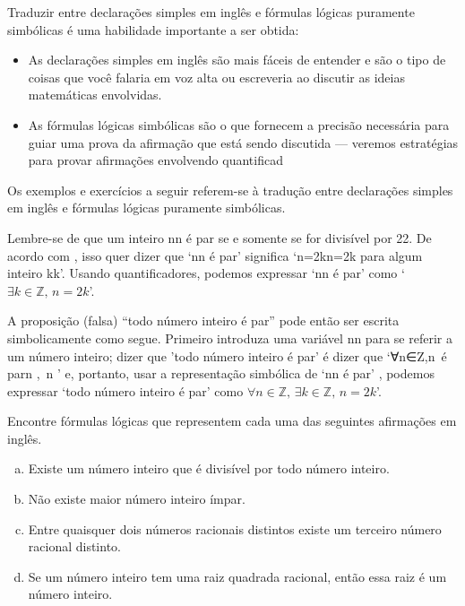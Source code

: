 Traduzir entre declarações simples em inglês e fórmulas lógicas puramente simbólicas é uma habilidade importante a ser obtida:
\begin{itemize}
\item As declarações simples em inglês são mais fáceis de entender e são o tipo de coisas que você falaria em voz alta ou escreveria ao discutir as ideias matemáticas envolvidas.
\item As fórmulas lógicas simbólicas são o que fornecem a precisão necessária para guiar uma prova da afirmação que está sendo discutida --- veremos estratégias para provar afirmações envolvendo quantificad
\end{itemize}

Os exemplos e exercícios a seguir referem-se à tradução entre declarações simples em inglês e fórmulas lógicas puramente simbólicas.
\begin{example}
Lembre-se de que um inteiro nn é par se e somente se for divisível por 22. De acordo com , isso quer dizer que `nn é par' significa `n=2kn=2k para algum inteiro kk'. Usando quantificadores, podemos expressar `nn é par' como `$\exists k \in \mathbb{Z},\, n=2k$'.

A proposição (falsa) “todo número inteiro é par” pode então ser escrita simbolicamente como segue. Primeiro introduza uma variável nn para se referir a um número inteiro; dizer que 'todo número inteiro é par' é dizer que `∀n∈Z,n é par\forall n \in {},\, n ' e, portanto, usar a representação simbólica de `nn é par' , podemos expressar `todo número inteiro é par' como $\forall n \in \mathbb{Z},\, \exists k \in \mathbb{Z},\, n=2k$'.
\end{example}

\begin{exercise}
\label{exEnglishToLogicalFormulae}
Encontre fórmulas lógicas que representem cada uma das seguintes afirmações em inglês.
\begin{enumerate}[(a)]
\item Existe um número inteiro que é divisível por todo número inteiro.
\item Não existe maior número inteiro ímpar.
\item Entre quaisquer dois números racionais distintos existe um terceiro número racional distinto.
\item Se um número inteiro tem uma raiz quadrada racional, então essa raiz é um número inteiro.
\end{enumerate}
\end{exercise}

